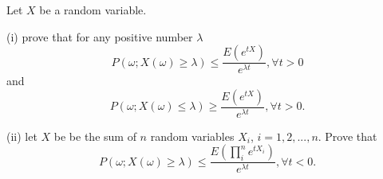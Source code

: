 \problem
\begin{question}
    Let $X$ be a random variable.  

    (i) prove that for any positive number $\lambda$
    \begin{equation}\label{3}
    P(\omega; X(\omega) \geq\lambda)\leq \frac{E(e^{t X})}{e^{\lambda t}}, \forall t>0
    \end{equation}
    and
    \begin{equation}\label{4}
    P(\omega; X(\omega) \leq\lambda)\geq \frac{E(e^{t X})}{e^{\lambda t}}, \forall t>0.
    \end{equation}

    (ii)  let $X$ be be the sum of $n$ random variables $X_i$, $i=1,2,...,n$.  Prove that
    \[P(\omega; X(\omega) \geq\lambda)\leq \frac{E(\prod_i^n e^{t X_i})}{e^{\lambda t}}, \forall t<0.\]

\end{question}

